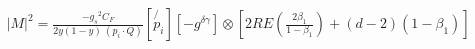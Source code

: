 %

\begin{equation}
\begin{split}
&|M|^{2}=\frac{-{g_s}^2 C_F}{2y (1-y)\:(p_i \cdot Q)}[\not{p_i}][-g^{\delta{{\gamma}}}]\otimes [2RE(\frac{2\beta_1}{1-\beta_1})+(d-2)(1-\beta_1)]\\
\end{split}
\end{equation}

















